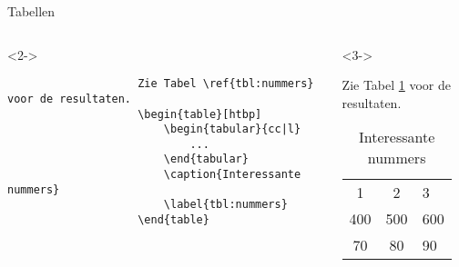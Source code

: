 \begin{frame}[fragile]{Tabellen}
    \bigskip
    \begin{columns}
        \begin{column}{0.5\textwidth}
            \begin{uncoverenv}<2->
                \begin{verbatim}
                    Zie Tabel \ref{tbl:nummers} voor de resultaten.
                    \begin{table}[htbp]
                        \begin{tabular}{cc|l}
                            ...
                        \end{tabular}
                        \caption{Interessante nummers}
                        \label{tbl:nummers}
                    \end{table}
                \end{verbatim}
            \end{uncoverenv}
        \end{column}
        \begin{column}{0.5\textwidth}
            \begin{uncoverenv}<3->
                \begin{adjustbox}{frame=1pt 10pt}%
                    \begin{minipage}{\textwidth-22pt}
                        Zie Tabel \ref{tbl:nummers} voor de resultaten.
                        \begin{table}[H]
                            \begin{tabular}{cc|l}
                                1   & 2   & 3   \\
                                400 & 500 & 600 \\
                                \hline
                                70  & 80  & 90
                            \end{tabular}
                            \caption{Interessante nummers}
                            \label{tbl:nummers}
                        \end{table}
                        \vspace{-20pt}
                    \end{minipage}
                \end{adjustbox}
            \end{uncoverenv}
        \end{column}
    \end{columns}
\end{frame}


